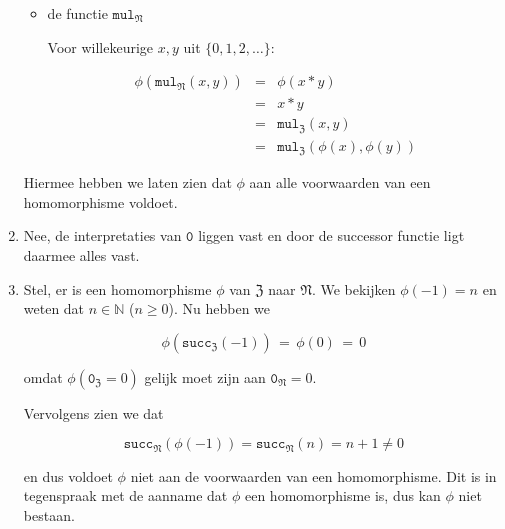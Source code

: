 \documentclass[a4paper,11pt]{article}
\begin{document}
\begin{enumerate}
\begin{itemize}
\item{de functie $\texttt{mul}_{\mathfrak{N}}$}

  Voor willekeurige $x,y$ uit $\{0,1,2,\ldots\}$:

  \begin{eqnarray*}
    \phi(\texttt{mul}_{\mathfrak{N}}(x,y)) & = & \phi(x*y) \\
                                         & = & x*y \\
                                         & = & \texttt{mul}_{\mathfrak{Z}}(x,y) \\
                                         & = & \texttt{mul}_{\mathfrak{Z}}(\phi(x),\phi(y))
  \end{eqnarray*}

\end{itemize}

Hiermee hebben we laten zien dat $\phi$ aan alle voorwaarden van een
homomorphisme voldoet.

\item %

Nee, de interpretaties van $\texttt{0}$ liggen vast en door de successor
functie ligt daarmee alles vast.


\item %

Stel, er is een homomorphisme $\phi$ van $\mathfrak{Z}$ naar
$\mathfrak{N}$. We bekijken $\phi(-1)=n$ en weten dat $n \in \mathbb{N}$ ($n
\ge 0$). Nu hebben we

\begin{displaymath}
\phi(\texttt{succ}_{\mathfrak{Z}}(-1)) \, = \, \phi(0) \, = \, 0
\end{displaymath}

omdat $\phi(\texttt{0}_{\mathfrak{Z}}=0)$ gelijk moet zijn aan
$\texttt{0}_{\mathfrak{N}} = 0$.

Vervolgens zien we dat

\begin{displaymath}
\texttt{succ}_{\mathfrak{N}}(\phi(-1)) = \texttt{succ}_{\mathfrak{N}}(n) = n+1 \ne 0
\end{displaymath}

en dus voldoet $\phi$ niet aan de voorwaarden van een homomorphisme. Dit is in
tegenspraak met de aanname dat $\phi$ een homomorphisme is, dus kan $\phi$ niet
bestaan.\\[2em]

\end{enumerate}
\end{document}
